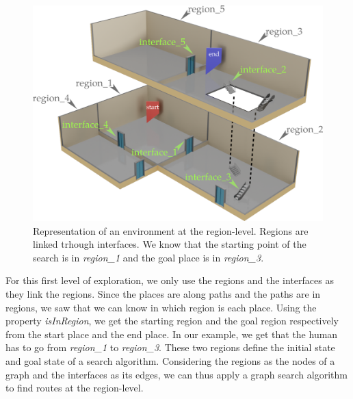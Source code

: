 \begin{figure}[ht!]
\centering
\includegraphics[scale=0.22]{figures/chapter3/building_regions.png}
\caption{\label{fig:chap3_regions} Representation of an environment at the region-level. Regions are linked trhough interfaces. We know that the starting point of the search is in \textit{region\_1} and the goal place is in \textit{region\_3}. }
\end{figure}

For this first level of exploration, we only use the regions and the interfaces as they link the regions. Since the places are along paths and the paths are in regions, we saw that we can know in which region is each place. Using the property \textit{isInRegion}, we get the starting region and the goal region respectively from the start place and the end place. In our example, we get that the human has to go from \textit{region\_1} to \textit{region\_3}. These two regions define the initial state and goal state of a search algorithm. Considering the regions as the nodes of a graph and the interfaces as its edges, we can thus apply a graph search algorithm to find routes at the region-level.


